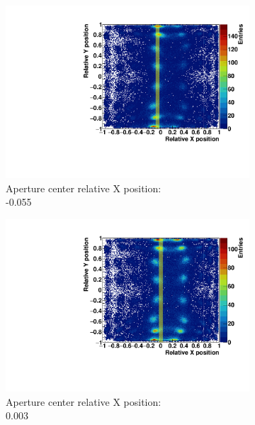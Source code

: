 \begin{figure}
\begin{subfigure}[t]{0.32\textwidth}
\centering
\includegraphics[width=\textwidth]{03_GraphicFiles/chapter3_CLaRySproto/Absorber/images_scan/line_1mm/run00020_floodMap.pdf}
\caption{Aperture center relative X position: \\ -0.055}
\label{chap3::fig::scan_map7_1mm}
\end{subfigure}
\begin{subfigure}[t]{0.32\textwidth}
\centering
\includegraphics[width=\textwidth]{03_GraphicFiles/chapter3_CLaRySproto/Absorber/images_scan/line_1mm/run00021_floodMap.pdf}
\caption{Aperture center relative X position: \\ 0.003}
\label{chap3::fig::scan_map8_1mm}
\end{subfigure}
\begin{subfigure}[t]{0.32\textwidth}

\end{subfigure}
\end{figure}
